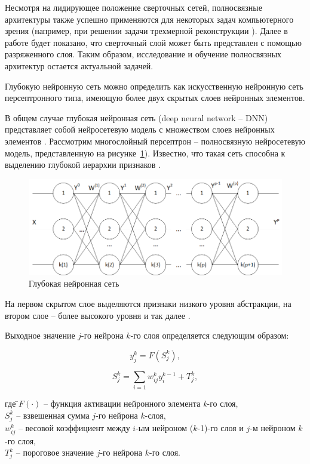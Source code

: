 Несмотря на лидирующее положение сверточных сетей, полносвязные архитектуры также успешно применяются для некоторых задач компьютерного зрения (например, при решении задачи трехмерной реконструкции \cite[c.~10]{mildenhall2020nerf}). Далее в работе будет показано, что сверточный слой может быть представлен с помощью разряженного слоя. Таким образом, исследование и обучение полносвязных архитектур остается актуальной задачей. 

Глубокую нейронную сеть можно определить как искусственную нейронную сеть персептронного типа, имеющую более двух скрытых слоев нейронных элементов.

В общем случае глубокая нейронная сеть (deep neural network -- DNN) представляет собой нейросетевую модель с множеством слоев нейронных элементов \cite[c.~59]{Golovko2015a}. Рассмотрим многослойный персептрон -- полносвязную нейросетевую модель, представленную на рисунке~\ref{fig:pic1_1}). Известно, что такая сеть способна к выделению глубокой иерархии признаков \cite[c.~3]{n5}. 

\begin{figure}[H]
  \centering
  \includegraphics[width=\textwidth]{man-source/images/ch1/pic1-1.png}
  \caption{Глубокая нейронная сеть}
  \label{fig:pic1_1}
\end{figure}

На первом скрытом слое выделяются признаки низкого уровня абстракции, на втором слое -- более высокого уровня и так далее \cite{n3}. 

Выходное значение $j$-го нейрона $k$-го слоя определяется следующим образом:

\begin{equation}
y_j^k=F(S_j^k),
\end{equation}

\begin{equation}
S_j^k=\sum_{i=1} w_{ij}^ky_i^{k-1}+T_j^k,
\end{equation}
\begin{tabbing}
где \=$F(\cdot)$ -- функция активации нейронного элемента \textit{k}-го слоя,\\
\>$S_j^k$ -- взвешенная сумма $j$-го нейрона $k$-слоя,\\
\>$w_{ij}^k$ -- весовой коэффициент между $i$-ым нейроном ($k$-1)-го слоя и $j$-м нейроном $k$-го слоя,\\
\>$T_j^k$ -- пороговое значение $j$-го нейрона $k$-го слоя.	
\end{tabbing}

